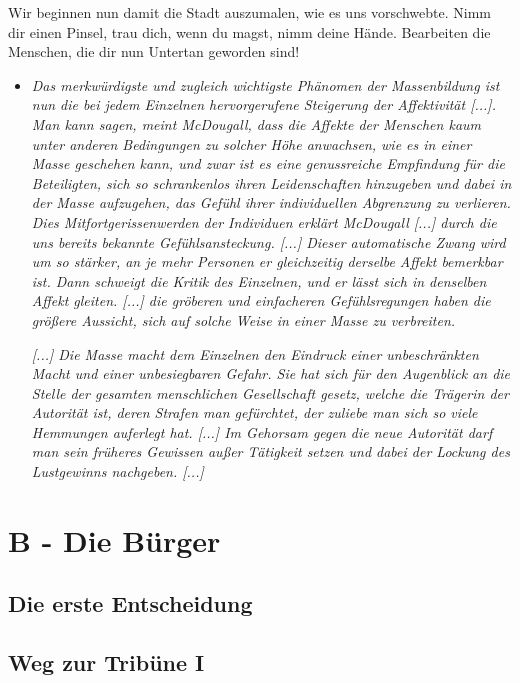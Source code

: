 \documentclass[a4paper, 12pt]{report}
\begin{document}
Wir beginnen nun damit die Stadt auszumalen, wie es uns vorschwebte.
Nimm dir einen Pinsel, trau dich, wenn du magst, nimm deine Hände. 
Bearbeiten die Menschen, die dir nun Untertan geworden sind!\\

\begin{itemize}
    \item[] \textit{Das merkwürdigste und zugleich wichtigste Phänomen der Massenbildung ist nun die bei jedem Einzelnen hervorgerufene Steigerung der Affektivität [...].
    Man kann sagen, meint McDougall, dass die Affekte der Menschen kaum unter anderen Bedingungen zu solcher Höhe anwachsen, wie es in einer Masse geschehen kann, und zwar ist es eine genussreiche Empfindung für die Beteiligten, sich so schrankenlos ihren Leidenschaften hinzugeben und dabei in der Masse aufzugehen, das Gefühl ihrer individuellen Abgrenzung zu verlieren.
    Dies Mitfortgerissenwerden der Individuen erklärt McDougall [...] durch die uns bereits bekannte Gefühlsansteckung. [...]
    Dieser automatische Zwang wird um so stärker, an je mehr Personen er gleichzeitig derselbe Affekt bemerkbar ist.
    Dann schweigt die Kritik des Einzelnen, und er lässt sich in denselben Affekt gleiten. [...]
    die gröberen und einfacheren Gefühlsregungen haben die größere Aussicht, sich auf solche Weise in einer Masse zu verbreiten.}

    \textit{[...] Die Masse macht dem Einzelnen den Eindruck einer unbeschränkten Macht und einer unbesiegbaren Gefahr.
    Sie hat sich für den Augenblick an die Stelle der gesamten menschlichen Gesellschaft gesetz, welche die Trägerin der Autorität ist, deren Strafen man gefürchtet, der zuliebe man sich so viele Hemmungen auferlegt hat.
    [...] Im Gehorsam gegen die neue Autorität darf man sein früheres \glqq Gewissen\grqq{} außer Tätigkeit setzen und dabei der Lockung des Lustgewinns nachgeben. [...]}
\end{itemize}
    

\section{B - Die Bürger}

\subsection{Die erste Entscheidung}

\subsection{Weg zur Tribüne I}
\end{document}
